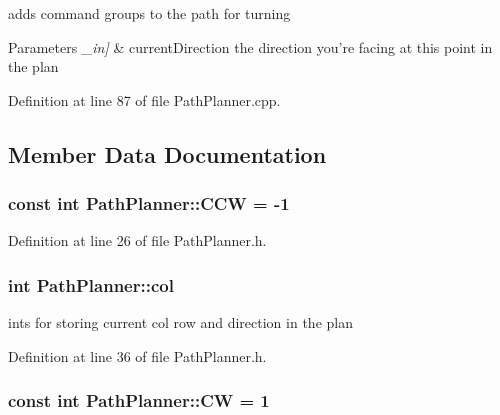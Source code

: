 adds command groups to the path for turning 


\begin{DoxyParams}{Parameters}
{\em \-\_\-in\mbox{]}} & current\-Direction the direction you're facing at this point in the plan \\
\hline
\end{DoxyParams}


Definition at line 87 of file Path\-Planner.\-cpp.



\subsection{Member Data Documentation}
\hypertarget{classPathPlanner_ab08a4cb0f762a4401a804bf0ce1bbbe6}{
\subsubsection[{C\-C\-W}]{\setlength{\rightskip}{0pt plus 5cm}const int Path\-Planner\-::\-C\-C\-W = -\/1\hspace{0.3cm}{\ttfamily [static]}}}\label{classPathPlanner_ab08a4cb0f762a4401a804bf0ce1bbbe6}


Definition at line 26 of file Path\-Planner.\-h.

\hypertarget{classPathPlanner_a20d2bf800c63aacfd1af314ad400d119}{
\subsubsection[{col}]{\setlength{\rightskip}{0pt plus 5cm}int Path\-Planner\-::col\hspace{0.3cm}{\ttfamily [private]}}}\label{classPathPlanner_a20d2bf800c63aacfd1af314ad400d119}


ints for storing current col row and direction in the plan 



Definition at line 36 of file Path\-Planner.\-h.

\hypertarget{classPathPlanner_af08949a4cd572b26f4f37ff441191b3a}{
\subsubsection[{C\-W}]{\setlength{\rightskip}{0pt plus 5cm}const int Path\-Planner\-::\-C\-W = 1\hspace{0.3cm}{\ttfamily [static]}}}\label{classPathPlanner_af08949a4cd572b26f4f37ff441191b3a}


